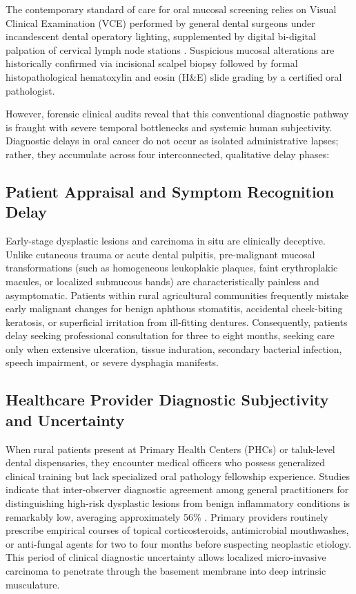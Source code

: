 \documentclass[12pt,a4paper,oneside]{report}
\begin{document}
The contemporary standard of care for oral mucosal screening relies on Visual Clinical Examination (VCE) performed by general dental surgeons under incandescent dental operatory lighting, supplemented by digital bi-digital palpation of cervical lymph node stations \cite{vanderwaal2020oral}. Suspicious mucosal alterations are historically confirmed via incisional scalpel biopsy followed by formal histopathological hematoxylin and eosin (H\&E) slide grading by a certified oral pathologist. 

However, forensic clinical audits reveal that this conventional diagnostic pathway is fraught with severe temporal bottlenecks and systemic human subjectivity. Diagnostic delays in oral cancer do not occur as isolated administrative lapses; rather, they accumulate across four interconnected, qualitative delay phases:

\subsection{Patient Appraisal and Symptom Recognition Delay}
Early-stage dysplastic lesions and carcinoma in situ are clinically deceptive. Unlike cutaneous trauma or acute dental pulpitis, pre-malignant mucosal transformations (such as homogeneous leukoplakic plaques, faint erythroplakic macules, or localized submucous bands) are characteristically painless and asymptomatic. Patients within rural agricultural communities frequently mistake early malignant changes for benign aphthous stomatitis, accidental cheek-biting keratosis, or superficial irritation from ill-fitting dentures. Consequently, patients delay seeking professional consultation for three to eight months, seeking care only when extensive ulceration, tissue induration, secondary bacterial infection, speech impairment, or severe dysphagia manifests.

\subsection{Healthcare Provider Diagnostic Subjectivity and Uncertainty}
When rural patients present at Primary Health Centers (PHCs) or taluk-level dental dispensaries, they encounter medical officers who possess generalized clinical training but lack specialized oral pathology fellowship experience. Studies indicate that inter-observer diagnostic agreement among general practitioners for distinguishing high-risk dysplastic lesions from benign inflammatory conditions is remarkably low, averaging approximately 56\% \cite{vanderwaal2020oral}. Primary providers routinely prescribe empirical courses of topical corticosteroids, antimicrobial mouthwashes, or anti-fungal agents for two to four months before suspecting neoplastic etiology. This period of clinical diagnostic uncertainty allows localized micro-invasive carcinoma to penetrate through the basement membrane into deep intrinsic musculature.
\end{document}

